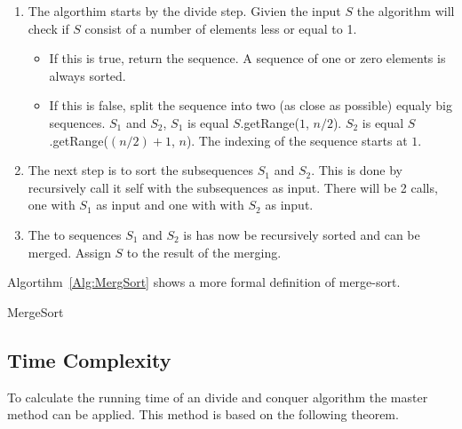 \begin{enumerate}
\item The algorthim starts by the divide step. Givien the input $S$ the algorithm will check if $S$ consist of a number of elements less or equal to 1.
\begin{itemize}
\item If this is true, return the sequence. A sequence of one or zero elements is always sorted.  
\item If this is false, split the sequence into two (as close as possible) equaly big sequences. $S_1$ and $S_2$, $S_1$ is equal $S$.getRange($1$, $n/2$).
$S_2$ is equal $S$.getRange($(n/2)+1$, $n$). The indexing of the sequence starts at $1$.
\end{itemize}
\item The next step is to sort the subsequences $S_1$ and $S_2$. This is done by recursively call it self with the subsequences as input. There will be 2 calls, one with $S_1$ as input and one with with $S_2$ as input.
\item The to sequences $S_1$ and $S_2$ is has now be recursively sorted and can be merged. Assign $S$ to the result of the merging.
\end{enumerate}
Algortihm~\ref{Alg:MergSort} shows a more formal definition of merge-sort.

\begin{algorithm}
\DontPrintSemicolon
{}
\caption{MergeSort}
\label{Alg:MergSort}
\end{algorithm}

\subsection{Time Complexity}
To calculate the running time of an divide and conquer algorithm the master method can be applied. \cite{Cormen} This method is based on the following theorem.


